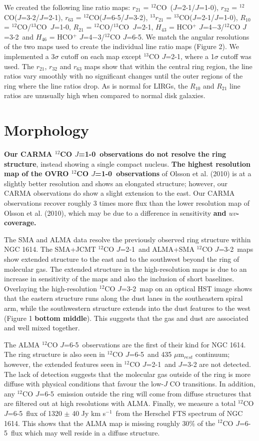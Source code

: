 \documentclass[preprint, 11pt]{aastex}
\newcommand{\tco}{$^{13}$CO}
\newcommand{\co}{$^{12}$CO}
\newcommand{\coone}{$^{12}$CO $J$=1-0}
\newcommand{\cotwo}{$^{12}$CO $J$=2-1}
\newcommand{\tcotwo}{$^{13}$CO $J$=2-1}
\newcommand{\cothree}{$^{12}$CO $J$=3-2}
\newcommand{\cosix}{$^{12}$CO $J$=6-5}
\newcommand{\kms}{km s$^{-1}$}
\newcommand{\hcofour}{HCO$^+$ $J$=4$-$3}
\begin{document}
We created the following line ratio maps: $r_{21}$ = \co\ ($J$=2-1/$J$=1-0),
$r_{32}$ = \co($J$=3-2/$J$=2-1),
$r_{63}$ = \co ($J$=6-5/$J$=3-2),
$^{13}r_{21}$ = \tco ($J$=2-1/$J$=1-0),
$R_{10}$ = \co/\tco\ $J$=1-0,
$R_{21}$ = \co/\tco\ $J$=2-1,
$H_{43}$ = \hcofour/\cothree\ and
$H_{46}$ = \hcofour/\cosix.
We match the angular resolutions of the two maps used to create the individual line ratio maps (Figure 2). We implemented a 3$\sigma$ cutoff on each map except \tcotwo, where a 1$\sigma$ cutoff was used. The  $r_{21}$, $r_{32}$ and $r_{63}$ maps show that within the central ring region, the line ratios vary smoothly with no significant changes until the outer regions of the ring where the line ratios drop. As is normal for LIRGs, the $R_{10}$ and $R_{21}$ line ratios are unusually high when compared to normal disk galaxies. 


\section{Morphology}

\textbf{Our CARMA \coone\ observations do not resolve the ring structure}, instead showing a single compact nucleus. \textbf{The highest resolution map of the OVRO \coone\ observations} of Olsson et al. (2010) is at a slightly better resolution and shows an elongated structure; however, our CARMA observations do show a slight extension to the east. Our CARMA observations recover roughly 3 times more flux than the lower resolution map of Olsson et al. (2010), which may be due to a difference in sensitivity \textbf{and $uv$-coverage.}

The SMA and ALMA data resolve the previously observed ring structure within NGC 1614. The SMA+JCMT \cotwo\ and ALMA+SMA \cothree\ maps show extended structure to the east and to the southwest beyond the ring of molecular gas. The extended structure in the high-resolution maps is due to an increase in sensitivity of the maps and also the inclusion of short baselines. Overlaying the high-resolution \cothree\ map on an optical HST image shows that the eastern structure runs along the dust lanes in the southeastern spiral arm, while the southwestern structure extends into the dust features to the west (Figure 1 \textbf{bottom middle}). This suggests that the gas and dust are associated and well mixed together.  

The ALMA \cosix\ observations are the first of their kind for NGC 1614. The ring structure is also seen in \cosix\ and 435 $\mu$m$_{rest}$ continuum; however, the extended features seen in \cotwo\ and $J$=3-2 are not detected. The lack of detection suggests that the molecular gas outside of the ring is more diffuse with physical conditions that favour the low-$J$ CO transitions. In addition, any \cosix\ emission outside the ring will come from diffuse structures that are filtered out at high resolutions with ALMA. 
Finally, we measure a total \cosix\ flux of 1320 $\pm$ 40 Jy \kms\ from the Herschel FTS spectrum of NGC 1614. This shows that the ALMA map is missing roughly 30$\%$ of the \cosix\ flux which may well reside in a diffuse structure. 
\end{document}
